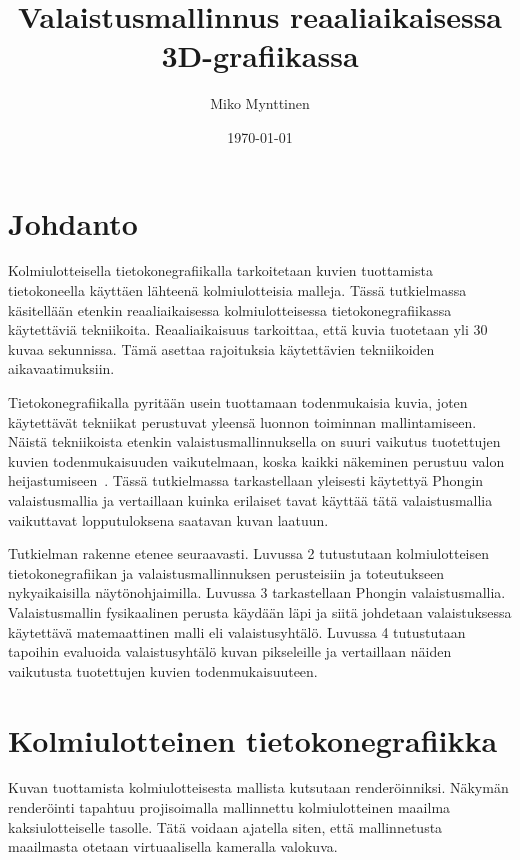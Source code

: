 \documentclass[finnish]{tktltiki2}
\title{Valaistusmallinnus reaaliaikaisessa 3D-grafiikassa}
\author{Miko Mynttinen}
\date{\today}
\theoremstyle{definition}
\theoremstyle{remark}
\begin{document}

\frontmatter      %

\maketitle        %
\makeabstract     %

\tableofcontents  %


\mainmatter       %

\section{Johdanto}
Kolmiulotteisella tietokonegrafiikalla tarkoitetaan kuvien tuottamista tietokoneella käyttäen lähteenä kolmiulotteisia malleja. Tässä tutkielmassa käsitellään etenkin reaaliaikaisessa kolmiulotteisessa tietokonegrafiikassa käytettäviä tekniikoita. Reaaliaikaisuus tarkoittaa, että kuvia tuotetaan yli 30 kuvaa sekunnissa. Tämä asettaa rajoituksia käytettävien tekniikoiden aikavaatimuksiin.

Tietokonegrafiikalla pyritään usein tuottamaan todenmukaisia kuvia, joten käytettävät tekniikat perustuvat yleensä luonnon toiminnan mallintamiseen. Näistä tekniikoista etenkin valaistusmallinnuksella on suuri vaikutus tuotettujen kuvien todenmukaisuuden vaikutelmaan, koska kaikki näkeminen perustuu valon heijastumiseen~\cite[s. 101-113]{Hughes}. Tässä tutkielmassa tarkastellaan yleisesti käytettyä Phongin valaistusmallia ja vertaillaan kuinka erilaiset tavat käyttää tätä valaistusmallia vaikuttavat lopputuloksena saatavan kuvan laatuun.

Tutkielman rakenne etenee seuraavasti. Luvussa 2 tutustutaan kolmiulotteisen tietokonegrafiikan ja valaistusmallinnuksen perusteisiin ja toteutukseen nykyaikaisilla näytönohjaimilla. Luvussa 3 tarkastellaan Phongin valaistusmallia. Valaistusmallin fysikaalinen perusta käydään läpi ja siitä johdetaan valaistuksessa käytettävä matemaattinen malli eli valaistusyhtälö. Luvussa 4 tutustutaan tapoihin evaluoida valaistusyhtälö kuvan pikseleille ja vertaillaan näiden vaikutusta tuotettujen kuvien todenmukaisuuteen.

\newpage
\section{Kolmiulotteinen tietokonegrafiikka}
Kuvan tuottamista kolmiulotteisesta mallista kutsutaan renderöinniksi. Näkymän renderöinti tapahtuu projisoimalla mallinnettu kolmiulotteinen maailma kaksiulotteiselle tasolle. Tätä voidaan ajatella siten, että mallinnetusta maailmasta otetaan virtuaalisella kameralla valokuva.
\end{document}
